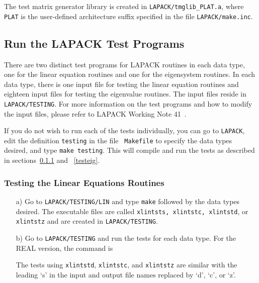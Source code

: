 \noindent
The test matrix generator library is created in {\tt LAPACK/tmglib\_PLAT.a},
where {\tt PLAT} is the user-defined architecture suffix specified in the 
file {\tt LAPACK/make.inc}.

\subsection{Run the LAPACK Test Programs}

\dent
There are two distinct test programs for LAPACK routines
in each data type, one for the linear equation routines and
one for the eigensystem routines.
In each data type, there is one input file for testing the linear
equation routines and eighteen input files for testing the eigenvalue
routines.
The input files reside in {\tt LAPACK/TESTING}.
For more information on the test programs and how to modify the
input files, please refer to LAPACK Working Note 41~\cite{WN41}.

If you do not wish to run each of the tests individually, you can
go to {\tt LAPACK}, edit the definition {\tt testing} in the file {\tt
Makefile} to specify the data types desired, and type {\tt make
testing}.  This will
compile and run the tests as described in sections~\ref{testlin} 
and ~\ref{testeig}.

 
\subsubsection{Testing the Linear Equations Routines}\label{testlin}

\begin{itemize}

\item[a)]
Go to {\tt LAPACK/TESTING/LIN} and type {\tt make} followed by the data types
desired.  The executable files are called {\tt xlintsts, xlintstc,
xlintstd}, or {\tt xlintstz} and are created in {\tt LAPACK/TESTING}.

\item[b)]
Go to {\tt LAPACK/TESTING} and run the tests for each data type.
For the REAL version, the command is

\noindent
The tests using {\tt xlintstd}, {\tt xlintstc}, and {\tt xlintstz} are similar
with the leading `s' in the input and output file names replaced
by `d', `c', or `z'.

\end{itemize}

